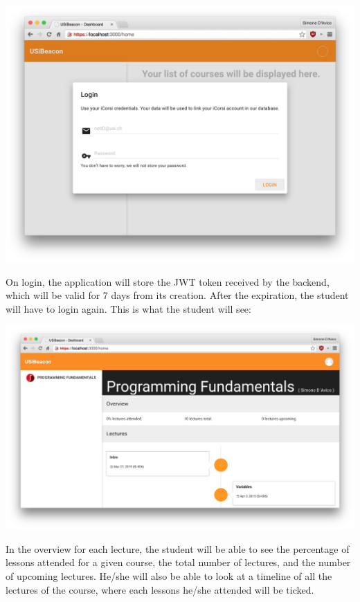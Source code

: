 \begin{center}
	\includegraphics[scale=0.4]{img/dashboard-login}
\end{center}

On login, the application will store the JWT token received by the backend, which will be valid for 7 days from its creation. After the expiration, the student will have to login again. This is what the student will see:

\begin{center}
	\includegraphics[scale=0.3]{img/dashboard-timeline}
\end{center}

In the overview for each lecture, the student will be able to see the percentage of lessons attended for a given course, the total number of lectures, and the number of upcoming lectures. He/she will also be able to look at a timeline of all the lectures of the course, where each lessons he/she attended will be ticked.